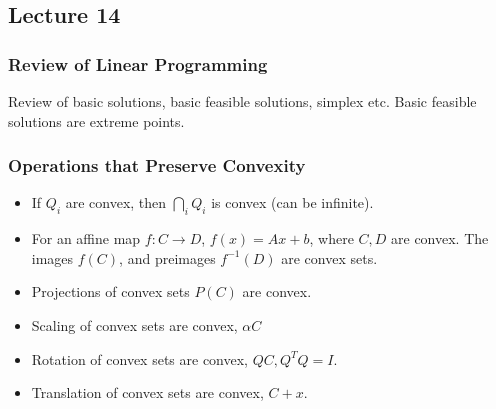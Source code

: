 \subsection{Lecture 14}
\subsubsection{Review of Linear Programming}
Review of basic solutions, basic feasible solutions, simplex etc. Basic feasible solutions are extreme points.
\subsubsection{Operations that Preserve Convexity}
\begin{itemize}
    \item If $Q_i$ are convex, then $\bigcap_i Q_i$ is convex (can be infinite).
    \item For an affine map $f: C \to D$, $f(x) = Ax + b$, where $C, D$ are convex. The images $f(C)$, and preimages $f^{-1}(D)$ are convex sets.
    \item Projections of convex sets $P(C)$ are convex.
    \item Scaling of convex sets are convex, $\alpha C$
    \item Rotation of convex sets are convex, $QC, Q^TQ = I$.
    \item Translation of convex sets are convex, $C + x$.
\end{itemize}
